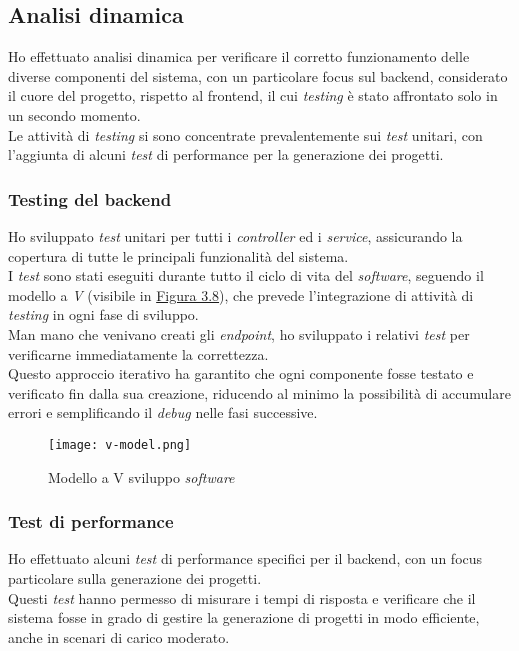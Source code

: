 \subsection{Analisi dinamica}
\label{subsec:analisi-dinamica}

Ho effettuato analisi dinamica per verificare il corretto funzionamento delle diverse componenti del sistema, con un particolare focus sul \gls{backend}, considerato il cuore del progetto, rispetto al \gls{frontend}, il cui \textit{testing} è stato affrontato solo in un secondo momento. \\
Le attività di \textit{testing} si sono concentrate prevalentemente sui \textit{test} unitari, con l'aggiunta di alcuni \textit{test} di performance per la generazione dei progetti.\\

\subsubsection{Testing del \gls{backend}}  

Ho sviluppato \textit{test} unitari per tutti i \textit{controller} ed i \textit{service}, assicurando la copertura di tutte le principali funzionalità del sistema.\\

\noindent I \textit{test} sono stati eseguiti durante tutto il ciclo di vita del \textit{software}, seguendo il modello a \textit{V} (visibile in {\hyperref[fig:v-model]{Figura 3.8}}), che prevede l’integrazione di attività di \textit{testing} in ogni fase di sviluppo.\\
    Man mano che venivano creati gli \textit{endpoint}, ho sviluppato i relativi \textit{test} per verificarne immediatamente la correttezza.\\

\noindent Questo approccio iterativo ha garantito che ogni componente fosse testato e verificato fin dalla sua creazione, riducendo al minimo la possibilità di accumulare errori e semplificando il \textit{debug} nelle fasi successive.\\

\begin{figure}[H]
    \centering
    \texttt{[image: v-model.png]}
    \caption{Modello a V sviluppo \textit{software}}
    \label{fig:v-model}  
    \cite{site:v-model}
\end{figure}

\subsubsection{Test di performance}  
Ho effettuato alcuni \textit{test} di performance specifici per il \gls{backend}, con un focus particolare sulla generazione dei progetti.\\
Questi \textit{test} hanno permesso di misurare i tempi di risposta e verificare che il sistema fosse in grado di gestire la generazione di progetti in modo efficiente, anche in scenari di carico moderato.\\
